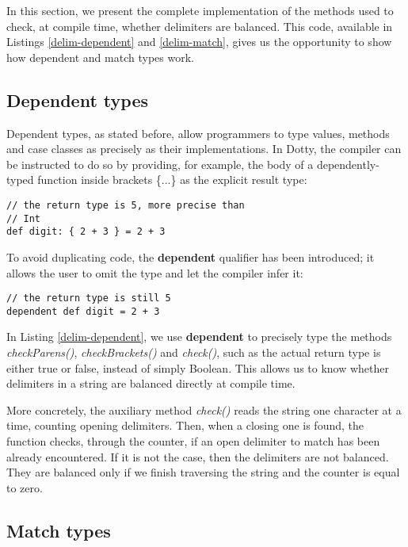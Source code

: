 In this section, we present the complete implementation of the methods used to check, at compile time, whether delimiters are balanced. This code, available in Listings \ref{delim-dependent} and \ref{delim-match}, gives us the opportunity to show how dependent and match types work.

\subsection{Dependent types}
Dependent types, as stated before, allow programmers to type values, methods and case classes as precisely as their implementations. In Dotty, the compiler can be instructed to do so by providing, for example, the body of a dependently-typed function inside brackets \{...\} as the explicit result type:

\begin{lstlisting}[style=myScalastyle]
// the return type is 5, more precise than
// Int
def digit: { 2 + 3 } = 2 + 3
\end{lstlisting} 

To avoid duplicating code, the \textbf{dependent} qualifier has been introduced; it allows the user to omit the type and let the compiler infer it:

\begin{lstlisting}[style=myScalastyle]
// the return type is still 5
dependent def digit = 2 + 3
\end{lstlisting} 

In Listing \ref{delim-dependent}, we use \textbf{dependent} to precisely type the methods \textit{checkParens()}, \textit{checkBrackets()} and \textit{check()}, such as the actual return type is either true or false, instead of simply Boolean. This allows us to know whether delimiters in a string are balanced directly at compile time.

More concretely, the auxiliary method \textit{check()} reads the string one character at a time, counting opening delimiters. Then, when a closing one is found, the function checks, through the counter, if an open delimiter to match has been already encountered. If it is not the case, then the delimiters are not balanced. They are balanced only if we finish traversing the string and the counter is equal to zero.

\subsection{Match types}
 
